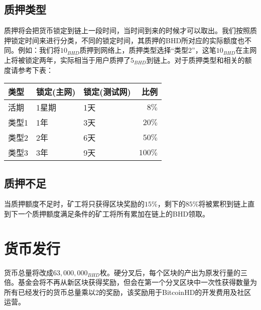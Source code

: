 \subsection{质押类型}
\begin{flushleft}
    质押将会把货币锁定到链上一段时间，当时间到来的时候才可以取出。我们按照质押锁定时间来进行分类，不同的锁定时间，其质押的BHD所对应的实际额度也不同。例如：我们将$10_{BHD}$质押到网络上，质押类型选择``类型2''，这笔$10_{BHD}$在主网上将被锁定两年，实际相当于用户质押了$5_{BHD}$到链上。对于质押类型和相关的额度请参考下表：
\end{flushleft}
\begin{tabular}{ |p{3cm}|p{3cm}|p{3cm}|r| }
    \hline
    \rowcolor{lightgray} 类型 & 锁定(主网) & 锁定(测试网) & 比例 \\[5pt]
    \hline
    活期 & 1星期 & 1天 & $8\%$ \\[5pt]
    \rowcolor{lightgray!30} 类型1 & 1年 & 3天 & $20\%$ \\[5pt]
    类型2 & 2年 & 6天 & $50\%$ \\[5pt]
    \rowcolor{lightgray!30} 类型3 & 3年 & 9天 & $100\%$ \\[5pt]
    \hline
\end{tabular}
\subsection{质押不足}
\begin{flushleft}
    当质押额度不足时，矿工将只获得区块奖励的$15\%$，剩下的$85\%$将被累积到链上直到下一个质押额度满足条件的矿工将所有累加在链上的BHD领取。
\end{flushleft}
\section{货币发行}
\begin{flushleft}
    货币总量将改成$63,000,000_{BHD}$枚。硬分叉后，每个区块的产出为原发行量的三倍。基金会将不再从新区块获得奖励，但会在第一个分叉区块中一次性获得数量为所有已经发行的货币总量乘以2的奖励，该奖励用于BitcoinHD的开发费用及社区运营。
\end{flushleft}

